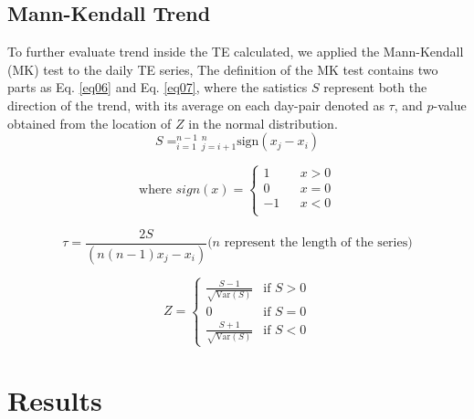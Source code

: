 \documentclass{elsarticle}
\def\sum{}%
\begin{document}
\subsection{Mann-Kendall Trend}
To further evaluate trend inside the TE calculated, we applied the Mann-Kendall (MK) test to the daily TE series, The definition of the MK test contains two parts as Eq. \ref{eq06} and Eq. \ref{eq07}, where the satistics $S$ represent both the direction of the trend, with its average on each day-pair denoted as $\tau$, and $p$-value obtained from the location of $Z$ in the normal distribution.
\begin{equation} \label{eq07}
S = \sum_{i=1}^{n-1} \sum_{j=i+1}^{n} \text{sign}(x_j - x_i)
\end{equation}

\begin{equation}\label{eq08}
  \text{where } sign(x) = \left\{
  \begin{array}{rcl}
  1 & & {x > 0}\\
  0 & & {x = 0}\\
  -1 & & {x < 0} \\
  \end{array} \right.
\end{equation}

\begin{equation} \label{eq09}
  \tau = \frac{2S}{(n(n-1)x_j - x_i)}\text{($n$ represent the length of the series)}
  \end{equation}

\begin{equation} \label{eq10}
Z = 
\begin{cases}
\frac{S - 1}{\sqrt{\text{Var}(S)}} & \text{if } S > 0 \\
0 & \text{if } S = 0 \\
\frac{S + 1}{\sqrt{\text{Var}(S)}} & \text{if } S < 0
\end{cases}
\end{equation}
\section{Results}
\end{document}
